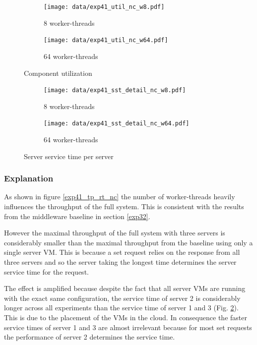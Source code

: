 \documentclass[report.tex]{subfiles}
\begin{document}
\begin{figure}
	\begin{subfigure}[b]{.49\linewidth}
		\centering
		\texttt{[image: data/exp41\_util\_nc\_w8.pdf]}
		\caption{8 worker-threads}
	\end{subfigure}\hfill
	\begin{subfigure}[b]{.49\linewidth}
		\centering
		\texttt{[image: data/exp41\_util\_nc\_w64.pdf]}
		\caption{64 worker-threads}
	\end{subfigure}%
	\caption{Component utilization}\label{exp41_util_nc}
\end{figure}


\begin{figure}
	\begin{subfigure}[b]{.49\linewidth}
		\centering
		\texttt{[image: data/exp41\_sst\_detail\_nc\_w8.pdf]}
		\caption{8 worker-threads}
	\end{subfigure}\hfill
	\begin{subfigure}[b]{.49\linewidth}
		\centering
		\texttt{[image: data/exp41\_sst\_detail\_nc\_w64.pdf]}
		\caption{64 worker-threads}
	\end{subfigure}%
	\caption{Server service time per server}\label{exp41_sst_detail_nc}
\end{figure}


\subsubsection{Explanation}


As shown in figure \ref{exp41_tp_rt_nc} the number of worker-threads heavily influences the throughput of the full system. This is consistent with the results from the middleware baseline in section \ref{exp32}.

However the maximal throughput of the full system with three servers is considerably smaller than the maximal throughput from the baseline using only a single server VM. This is because a set request relies on the response from all three servers and so the server taking the longest time determines the server service time for the request.

The effect is amplified because despite the fact that all server VMs are running with the exact same configuration, the service time of server 2 is considerably longer across all experiments than the service time of server 1 and 3 (Fig. \ref{exp41_sst_detail_nc}). This is due to the placement of the VMs in the cloud. 
In consequence the faster service times of server 1 and 3 are almost irrelevant because for most set requests the performance of server 2 determines the service time.
\end{document}
